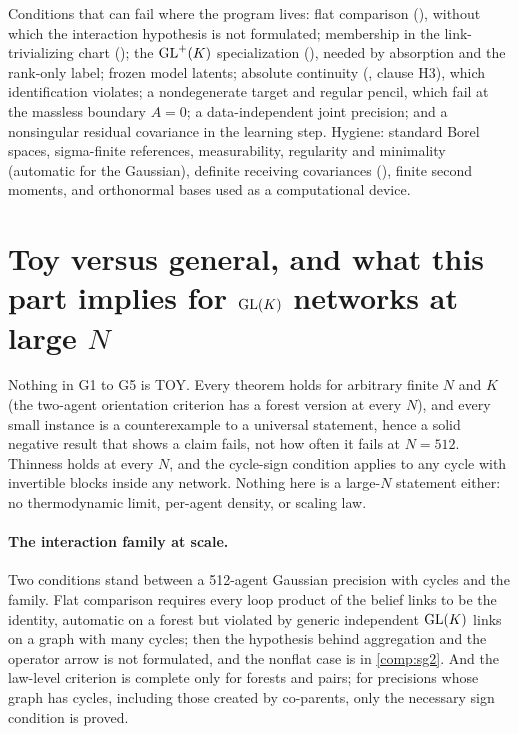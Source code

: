 \begin{hygiene}
Conditions that can fail where the program lives: flat comparison (),
without which the interaction hypothesis is not formulated; membership in the link-trivializing chart
(); the \(\mathrm{GL}^+(K)\) specialization (),
needed by absorption and the rank-only label; frozen model latents; absolute continuity
(, clause H3), which identification violates; a nondegenerate target and
regular pencil, which fail at the massless boundary \(A=0\); a data-independent joint precision; and a
nonsingular residual covariance in the learning step. Hygiene: standard Borel spaces, sigma-finite
references, measurability, regularity and minimality (automatic for the Gaussian), definite receiving
covariances (), finite second moments, and orthonormal bases used as a computational
device.
\end{hygiene}

\section{Toy versus general, and what this part implies for \texorpdfstring{\(\mathrm{GL}(K)\)}{GL(K)} networks at large \texorpdfstring{\(N\)}{N}}
\label{comp:sg1-scale}

Nothing in G1 to G5 is TOY. Every theorem holds for arbitrary finite \(N\) and \(K\) (the two-agent
orientation criterion has a forest version at every \(N\)), and every small instance is a counterexample
to a universal statement, hence a solid negative result that shows a claim fails, not how often it fails
at \(N=512\). Thinness holds at every \(N\), and the cycle-sign condition
applies to any cycle with invertible blocks inside any network. Nothing here is a large-\(N\) statement
either: no thermodynamic limit, per-agent density, or scaling law.

\paragraph{The interaction family at scale.} Two conditions stand between a 512-agent Gaussian precision
with cycles and the family. Flat comparison requires every loop product of the belief links to be the
identity, automatic on a forest but violated by generic independent \(\mathrm{GL}(K)\) links on a graph with
many cycles; then the hypothesis behind aggregation and the operator arrow is not formulated, and the
nonflat case is in \cref{comp:sg2}. And the law-level criterion is complete only for forests and pairs;
for precisions whose graph has cycles, including those created by co-parents, only the necessary sign
condition is proved.

